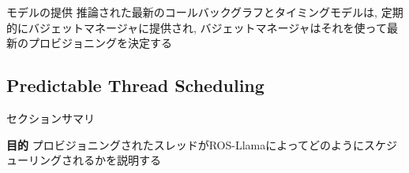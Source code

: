 

\begin{frame}{モデルの提供}
    推論された最新のコールバックグラフとタイミングモデルは, 定期的にバジェットマネージャに提供され, バジェットマネージャはそれを使って最新のプロビジョニングを決定する
\end{frame}


\subsection{Predictable Thread Scheduling}
\label{ssec: predictable thread scheduling}

\begin{frame}{セクションサマリ}
    \begin{itembox}[l]{\textbf{目的}}
        プロビジョニングされたスレッドがROS-Llamaによってどのようにスケジューリングされるかを説明する
    \end{itembox}
\end{frame}

